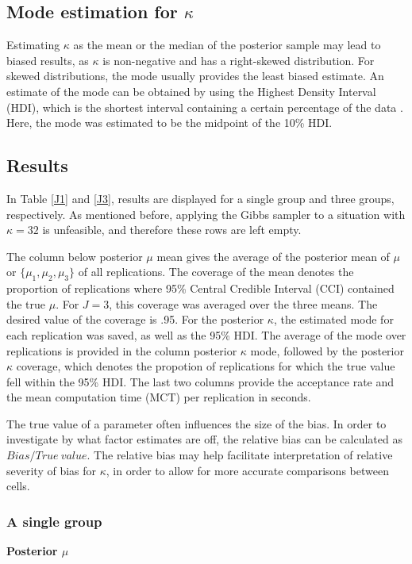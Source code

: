 \documentclass[bib]{ba/ba}
\begin{document}
\subsection{Mode estimation for $\kappa$ \label{hdimode}}

Estimating $\kappa$ as the mean or the median of the posterior sample may lead to biased results, as $\kappa$ is non-negative and has a right-skewed distribution. For skewed distributions, the mode usually provides the least biased estimate. An estimate of the mode can be obtained by using the Highest Density Interval (HDI), which is the shortest interval containing a certain percentage of the data \citep{venter1967estimation}. Here, the mode was estimated to be the midpoint of the 10\% HDI. 

\subsection{Results}

In Table \ref{J1} and \ref{J3}, results are displayed for a single group and three groups, respectively. As mentioned before, applying the Gibbs sampler to a situation with $\kappa=32$ is unfeasible, and therefore these rows are left empty. 

The column below posterior $\mu$ mean gives the average of the posterior mean of $\mu$ or $\{\mu_1, \mu_2, \mu_3 \}$ of all replications. The coverage of the mean denotes the proportion of replications where 95\% Central Credible Interval (CCI) contained the true $\mu$. For $J=3$, this coverage was averaged over the three means. The desired value of the coverage is .95. For the posterior $\kappa$, the estimated mode for each replication was saved, as well as the 95\% HDI. The average of the mode over replications is provided in the column posterior $\kappa$ mode, followed by the posterior $\kappa$ coverage, which denotes the propotion of replications for which the true value fell within the 95\% HDI. The last two columns provide the acceptance rate and the mean computation time (MCT) per replication in seconds. 

The true value of a parameter often influences the size of the bias. In order to investigate by what factor estimates are off, the relative bias can be calculated as $Bias/True~value$. The relative bias may help facilitate interpretation of relative severity of bias for $\kappa$, in order to allow for more accurate comparisons between cells. 

\subsubsection{A single group}
\noindent \textbf{Posterior $\mu$}
\end{document}
